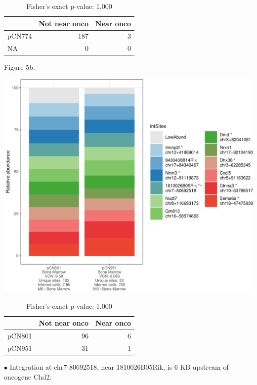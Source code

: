 \documentclass[12pt,]{article}
\begin{document}
\begin{table}[!h]

\caption{\label{tab:unnamed-chunk-5}Fisher's exact p-value: 1.000}
\centering
\begin{tabular}[t]{lrr}
\toprule
  & Not near onco & Near onco\\
\midrule
pCN774 & 187 & 3\\
NA & 0 & 0\\
\bottomrule
\end{tabular}
\end{table}

\newpage

Figure 5b.

\includegraphics{project.group2_files/figure-latex/unnamed-chunk-5-2.pdf}
\vspace{1.0cm}

\begin{table}[!h]

\caption{\label{tab:unnamed-chunk-5}Fisher's exact p-value: 1.000}
\centering
\begin{tabular}[t]{lrr}
\toprule
  & Not near onco & Near onco\\
\midrule
pCN801 & 96 & 6\\
pCN951 & 31 & 1\\
\bottomrule
\end{tabular}
\end{table}

\vspace{2.0cm} \fontsize{10}{10}\selectfont
\(\bullet\) Integration at chr7-80692518, near 1810026B05Rik, is 6 KB
upstream of oncogene Chd2. \fontsize{12}{16}\selectfont
\end{document}
